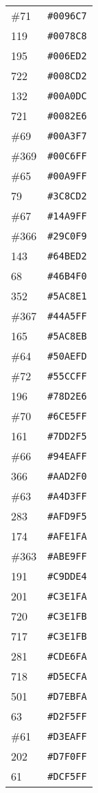 \documentclass[a4paper]{article}
\begin{document}
\begin{longtable}{|l|r|}
\#71 & \texttt{\#0096C7} \\
119 & \texttt{\#0078C8} \\
195 & \texttt{\#006ED2} \\
722 & \texttt{\#008CD2} \\
132 & \texttt{\#00A0DC} \\
721 & \texttt{\#0082E6} \\
\#69 & \texttt{\#00A3F7} \\
\#369 & \texttt{\#00C6FF} \\
\#65 & \texttt{\#00A9FF} \\
79 & \texttt{\#3C8CD2} \\
\#67 & \texttt{\#14A9FF} \\
\#366 & \texttt{\#29C0F9} \\
143 & \texttt{\#64BED2} \\
68 & \texttt{\#46B4F0} \\
352 & \texttt{\#5AC8E1} \\
\#367 & \texttt{\#44A5FF} \\
165 & \texttt{\#5AC8EB} \\
\#64 & \texttt{\#50AEFD} \\
\#72 & \texttt{\#55CCFF} \\
196 & \texttt{\#78D2E6} \\
\#70 & \texttt{\#6CE5FF} \\
161 & \texttt{\#7DD2F5} \\
\#66 & \texttt{\#94EAFF} \\
366 & \texttt{\#AAD2F0} \\
\#63 & \texttt{\#A4D3FF} \\
283 & \texttt{\#AFD9F5} \\
174 & \texttt{\#AFE1FA} \\
\#363 & \texttt{\#ABE9FF} \\
191 & \texttt{\#C9DDE4} \\
201 & \texttt{\#C3E1FA} \\
720 & \texttt{\#C3E1FB} \\
717 & \texttt{\#C3E1FB} \\
281 & \texttt{\#CDE6FA} \\
718 & \texttt{\#D5ECFA} \\
501 & \texttt{\#D7EBFA} \\
63 & \texttt{\#D2F5FF} \\
\#61 & \texttt{\#D3EAFF} \\
202 & \texttt{\#D7F0FF} \\
61 & \texttt{\#DCF5FF} \\

\end{longtable}
\end{document}
